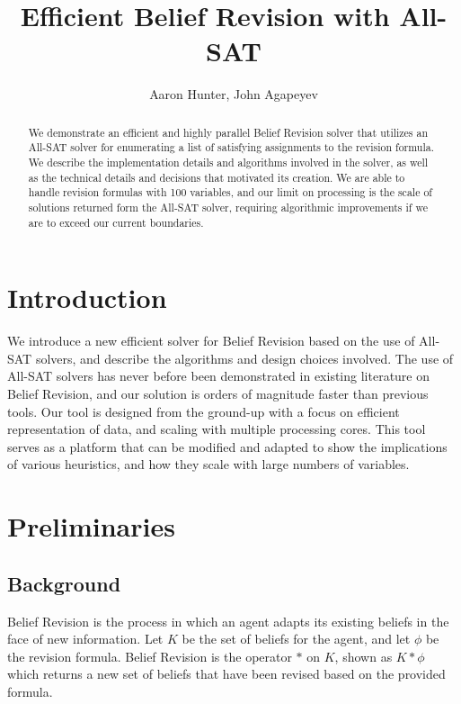 \documentclass[english]{article}
\begin{document}
\title{Efficient Belief Revision with All-SAT}

\author{Aaron Hunter, John Agapeyev}
\maketitle
\begin{abstract}
We demonstrate an efficient and highly parallel Belief Revision solver
that utilizes an All-SAT solver for enumerating a list of satisfying
assignments to the revision formula. We describe the implementation
details and algorithms involved in the solver, as well as the technical
details and decisions that motivated its creation. We are able to
handle revision formulas with 100 variables, and our limit on processing
is the scale of solutions returned form the All-SAT solver, requiring
algorithmic improvements if we are to exceed our current boundaries.
\end{abstract}

\section{Introduction}

We introduce a new efficient solver for Belief Revision based on the
use of All-SAT solvers, and describe the algorithms and design choices
involved. The use of All-SAT solvers has never before been demonstrated
in existing literature on Belief Revision, and our solution is orders
of magnitude faster than previous tools. Our tool is designed from
the ground-up with a focus on efficient representation of data, and
scaling with multiple processing cores. This tool serves as a platform
that can be modified and adapted to show the implications of various
heuristics, and how they scale with large numbers of variables.

\section{Preliminaries}

\subsection{Background}

Belief Revision is the process in which an agent adapts its existing
beliefs in the face of new information. Let $K$ be the set of beliefs
for the agent, and let $\phi$ be the revision formula. Belief Revision
is the operator $\ast$ on $K$, shown as $K\ast\phi$ which returns
a new set of beliefs that have been revised based on the provided
formula.
\end{document}

